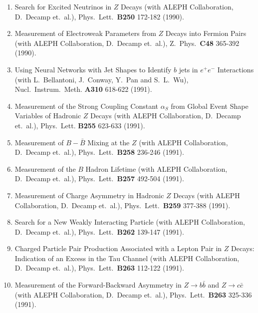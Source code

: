 \begin{enumerate}
\item    Search for Excited Neutrinos in $Z$ Decays 
         (with ALEPH Collaboration, D.~Decamp et.~al.),
         Phys.~Lett.~{\bf B250} 172-182 (1990).

\item    Measurement of Electroweak Parameters from $Z$ Decays into 
         Fermion Pairs 
         (with ALEPH Collaboration, D.~Decamp et.~al.),
         Z.~Phys.~{\bf C48} 365-392 (1990).

\item    Using Neural Networks with Jet Shapes to Identify $b$ jets
         in $e^+ e^-$ Interactions (with L.~Bellantoni, J.~Conway, Y.~Pan
         and S.~L.~Wu), Nucl.~Instrum.~Meth. {\bf A310} 618-622 (1991).

\item    Measurement of the Strong Coupling Constant $\alpha_S$ from
         Global Event Shape Variables of Hadronic $Z$ Decays
         (with ALEPH Collaboration, D.~Decamp et.~al.),
         Phys.~Lett. {\bf B255} 623-633 (1991).

\item    Measurement of $B - \bar B$ Mixing at the $Z$
         (with ALEPH Collaboration, D.~Decamp et.~al.),
         Phys.~Lett.~{\bf B258} 236-246 (1991).

\item    Measurement of the $B$ Hadron Lifetime 
         (with ALEPH Collaboration, D.~Decamp et.~al.),
         Phys.~Lett.~{\bf B257} 492-504 (1991).

\item    Measurement of Charge Asymmetry in Hadronic $Z$ Decays
         (with ALEPH Collaboration, D.~Decamp et.~al.),
         Phys.~Lett.~{\bf B259} 377-388 (1991).

\item    Search for a New Weakly Interacting Particle
         (with ALEPH Collaboration, D.~Decamp et.~al.),
         Phys.~Lett.~{\bf B262} 139-147 (1991).

\item    Charged Particle Pair Production Associated with a Lepton Pair
         in $Z$ Decays: Indication of an Excess in the Tau Channel
         (with ALEPH Collaboration, D.~Decamp et.~al.),
         Phys.~Lett.~{\bf B263} 112-122 (1991).

\item    Measurement of the Forward-Backward Asymmetry in 
         $Z \rightarrow b \bar b$ and $Z \rightarrow c \bar c$
         (with ALEPH Collaboration, D.~Decamp et.~al.),
         Phys.~Lett.~{\bf B263} 325-336 (1991).


\end{enumerate}
